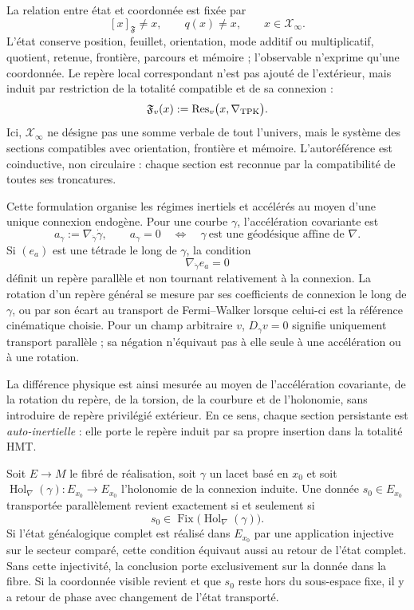 La relation entre état et coordonnée est fixée par
\[
 [x]_{\mathfrak F}\ne x,
 \qquad
 q(x)\ne x,
 \qquad
 x\in\mathcal X_\infty.
\]
L’état conserve position, feuillet, orientation, mode additif ou multiplicatif, quotient, retenue, frontière, parcours et mémoire ; l’observable n’exprime qu’une coordonnée. Le repère local correspondant n’est pas ajouté de l’extérieur, mais induit par restriction de la totalité compatible et de sa connexion :
\begin{equation}
 \mathfrak F_v(x)
 :=\operatorname{Res}_v\bigl(x,
          \nabla_{\rm TPK}\bigr).
 \label{eq:marco-local-totalidad-rev10}
\end{equation}
Ici, \(\mathcal X_\infty\) ne désigne pas une somme verbale de tout l’univers, mais le système des sections compatibles avec orientation, frontière et mémoire. L’autoréférence est coinductive, non circulaire : chaque section est reconnue par la compatibilité de toutes ses troncatures.

Cette formulation organise les régimes inertiels et accélérés au moyen d’une unique connexion endogène. Pour une courbe \(\gamma\), l’accélération covariante est
\[
 a_\gamma:=\nabla_{\dot\gamma}\dot\gamma,
 \qquad
 a_\gamma=0
 \quad\Longleftrightarrow\quad
 \gamma\ \text{est une géodésique affine de }\nabla.
\]
Si \((e_a)\) est une tétrade le long de \(\gamma\), la condition
\[
 \nabla_{\dot\gamma}e_a=0
\]
définit un repère parallèle et non tournant relativement à la connexion. La rotation d’un repère général se mesure par ses coefficients de connexion le long de \(\gamma\), ou par son écart au transport de Fermi--Walker lorsque celui-ci est la référence cinématique choisie. Pour un champ arbitraire \(v\), \(D_\gamma v=0\) signifie uniquement transport parallèle ; sa négation n’équivaut pas à elle seule à une accélération ou à une rotation.

La différence physique est ainsi mesurée au moyen de l’accélération covariante, de la rotation du repère, de la torsion, de la courbure et de l’holonomie, sans introduire de repère privilégié extérieur. En ce sens, chaque section persistante est \emph{auto-inertielle} : elle porte le repère induit par sa propre insertion dans la totalité HMT.

\begin{proposition}
\label{prop:autoinercia-holonomia-rev2}
Soit \(E\to M\) le fibré de réalisation, soit \(\gamma\) un lacet basé en \(x_0\) et soit \(\operatorname{Hol}_{\nabla}(\gamma):E_{x_0}\to E_{x_0}\) l’holonomie de la connexion induite. Une donnée \(s_0\in E_{x_0}\) transportée parallèlement revient exactement si et seulement si
\[
 s_0\in\operatorname{Fix}
 \bigl(\operatorname{Hol}_{\nabla}(\gamma)\bigr).
\]
Si l’état généalogique complet est réalisé dans \(E_{x_0}\) par une application injective sur le secteur comparé, cette condition équivaut aussi au retour de l’état complet. Sans cette injectivité, la conclusion porte exclusivement sur la donnée dans la fibre. Si la coordonnée visible revient et que \(s_0\) reste hors du sous-espace fixe, il y a retour de phase avec changement de l’état transporté.
\end{proposition}

